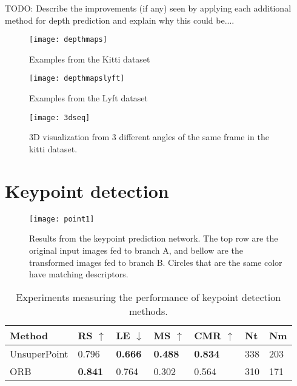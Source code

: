 TODO: Describe the improvements (if any) seen by applying each additional method for depth prediction and explain why this could be....

\iffalse
\begin{figure}[H]
	\centering
	\texttt{[image: evaluation]}
	\caption{Evaluation metrics when testing the configurations on the testing split of the datasets}
	\label{fig:evaluation}
\end{figure}
\fi

\clearpage

\begin{figure}[H]
	\centering
	\texttt{[image: depthmaps]}
	\caption{Examples from the Kitti dataset}
	\label{fig:depthmapskitty}
\end{figure}

\begin{figure}[H]
	\centering
	\texttt{[image: depthmapslyft]}
	\caption{Examples from the Lyft dataset}
	\label{fig:depthmaplyft}
\end{figure}

\begin{figure}[H]
	\centering
	\texttt{[image: 3dseq]}
	\caption{3D visualization from 3 different angles of the same frame in the kitti dataset.}
	\label{fig:3dseq}
\end{figure}

\section{Keypoint detection}

\begin{figure}[H]
	\centering
	\texttt{[image: point1]}
	\caption{Results from the keypoint prediction network. The top row are the original input images fed to branch A, and bellow are the transformed images fed to branch B. Circles that are the same color have matching descriptors.}
	\label{fig:point1}
\end{figure}

\begin{table}[H]
\centering
\begin{tabular}{|l|l|l|l|l|l|l|}
\hline
Method & RS $\uparrow$ & LE $\downarrow$ & MS $\uparrow$ & CMR $\uparrow$ & Nt & Nm \\
\hline
UnsuperPoint & 0.796 & \textbf{0.666} & \textbf{0.488} & \textbf{0.834} & 338 & 203 \\
ORB & \textbf{0.841} & 0.764 & 0.302 & 0.564 & 310 & 171 \\
\hline
\end{tabular}
\caption{Experiments measuring the performance of keypoint detection methods.}
\label{table:pointsbenchmark}
\end{table}

